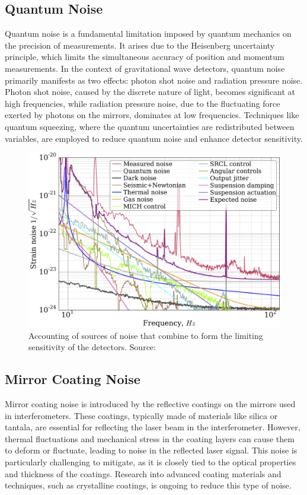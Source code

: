 \subsection{Quantum Noise} Quantum noise is a fundamental limitation imposed by quantum mechanics on the precision of measurements. It arises due to the Heisenberg uncertainty principle, which limits the simultaneous accuracy of position and momentum measurements. In the context of gravitational wave detectors, quantum noise primarily manifests as two effects: photon shot noise and radiation pressure noise. Photon shot noise, caused by the discrete nature of light, becomes significant at high frequencies, while radiation pressure noise, due to the fluctuating force exerted by photons on the mirrors, dominates at low frequencies. Techniques like quantum squeezing, where the quantum uncertainties are redistributed between variables, are employed to reduce quantum noise and enhance detector sensitivity.
\begin{figure}[h]
        \centering
        \includegraphics[width=4.5in]{images_/noise.png}
        \caption{ Accounting of sources of noise that combine to form the limiting sensitivity of the detectors. Source: \citep{PhysRevD.93.112004}}
        \label{fig:noises}
\end{figure}

\subsection{Mirror Coating Noise} Mirror coating noise is introduced by the reflective coatings on the mirrors used in interferometers. These coatings, typically made of materials like silica or tantala, are essential for reflecting the laser beam in the interferometer. However, thermal fluctuations and mechanical stress in the coating layers can cause them to deform or fluctuate, leading to noise in the reflected laser signal. This noise is particularly challenging to mitigate, as it is closely tied to the optical properties and thickness of the coatings. Research into advanced coating materials and techniques, such as crystalline coatings, is ongoing to reduce this type of noise.

